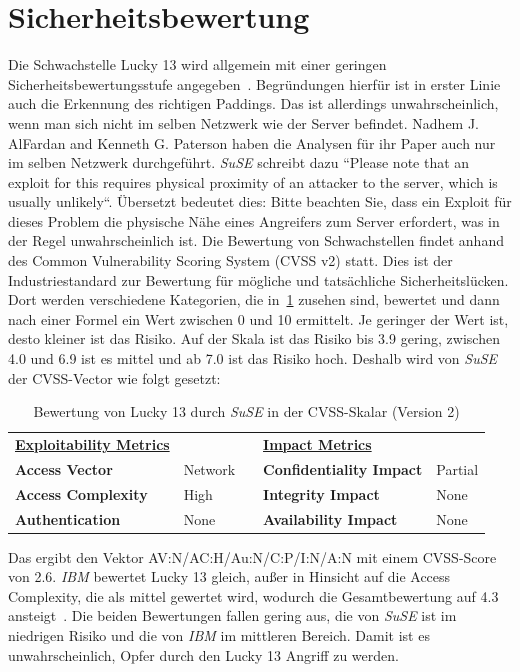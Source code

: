 \documentclass[a4paper,10pt]{scrartcl}
\begin{document}
    \section{Sicherheitsbewertung}\label{sec:sicherheitsbewertung}
    Die Schwachstelle Lucky 13 wird allgemein mit einer geringen Sicherheitsbewertungsstufe angegeben~\cite{DATABASE2013}.
    Begründungen hierfür ist in erster Linie auch die Erkennung des richtigen Paddings.
    Das ist allerdings unwahrscheinlich, wenn man sich nicht im selben Netzwerk wie der Server befindet.
    Nadhem J. AlFardan and Kenneth G. Paterson haben die Analysen für ihr Paper auch nur im selben Netzwerk durchgeführt.
    \emph{SuSE} schreibt dazu ``Please note that an exploit for this requires physical proximity of an attacker to the server, which is usually unlikely``.
    Übersetzt bedeutet dies: Bitte beachten Sie, dass ein Exploit für dieses Problem die physische Nähe eines Angreifers zum Server erfordert, was in der Regel unwahrscheinlich ist.
    \newline
    Die Bewertung von Schwachstellen findet anhand des Common Vulnerability Scoring System (CVSS v2) statt.
    Dies ist der Industriestandard zur Bewertung für mögliche und tatsächliche Sicherheitslücken.
    Dort werden verschiedene Kategorien, die in~\ref{tab:CVSS-Vektor} zusehen sind, bewertet und dann nach einer Formel ein Wert zwischen 0 und 10 ermittelt.
    Je geringer der Wert ist, desto kleiner ist das Risiko.
    Auf der Skala ist das Risiko bis 3.9 gering, zwischen 4.0 und 6.9 ist es mittel und ab 7.0 ist das Risiko hoch.
    Deshalb wird von \emph{SuSE} der CVSS-Vector wie folgt gesetzt:
    \begin{table}[h]
        \begin{tabular}{lllll}
        {\ul \textbf{Exploitability Metrics}}
            &         & & {\ul \textbf{Impact Metrics}}   & \multicolumn{1}{c}{} \\
            \textbf{Access Vector}     & Network & & \textbf{Confidentiality Impact} & Partial              \\
            \textbf{Access Complexity} & High    & & \textbf{Integrity Impact}       & None                 \\
            \textbf{Authentication}    & None    & & \textbf{Availability Impact}    & None
        \end{tabular}\caption{Bewertung von Lucky 13 durch \emph{SuSE} in der CVSS-Skalar (Version 2) \cite{SuSE2013}}\label{tab:CVSS-Vektor}
    \end{table}
    \newline
    Das ergibt den Vektor AV:N/AC:H/Au:N/C:P/I:N/A:N mit einem CVSS-Score von 2.6.
    \emph{IBM} bewertet Lucky 13 gleich, außer in Hinsicht auf die Access Complexity, die als mittel gewertet wird, wodurch die Gesamtbewertung auf 4.3 ansteigt~\cite{IBM2013}.
    Die beiden Bewertungen fallen gering aus, die von \emph{SuSE} ist im niedrigen Risiko und die von \emph{IBM} im mittleren Bereich.
    Damit ist es unwahrscheinlich, Opfer durch den Lucky 13 Angriff zu werden.
\end{document}
